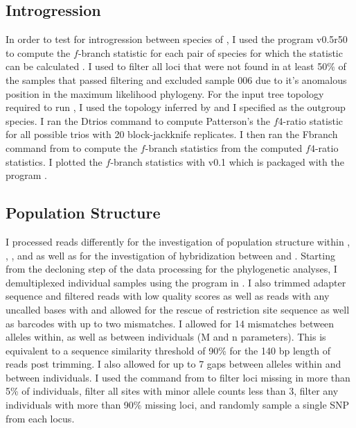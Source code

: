 \subsection{Introgression}
In order to test for introgression between species of \anaxyrus, I used the 
program \dsuite v0.5r50 \parencite{malinsky2021} to compute the $f$-branch 
statistic for each pair of \anaxyrus species for which the statistic 
can be calculated \parencite{reich2009,malinsky2018}. 
I used \pyrad to filter all loci that were not found in at least 50\% of the 
samples that passed filtering and excluded sample 006 due to it's anomalous 
position in the maximum likelihood phylogeny.
For the input tree topology required to run \dsuite, I used the topology inferred
by \phycoeval and I specified \nebulifer as the outgroup species.
I ran the \dsuite Dtrios command to compute Patterson's the $f4$-ratio
statistic for all possible trios with 20 block-jackknife replicates.
I then ran the Fbranch command from \dsuite to compute the $f$-branch statistics 
from the computed $f4$-ratio statistics. 
I plotted the $f$-branch statistics with \dtools v0.1 which is packaged with
the \dsuite program \parencite{malinsky2021}. 

\subsection{Population Structure}
I processed reads differently for the investigation of population structure within
\amer, \fowl, \terr, and \wood as well as for the investigation of hybridization
between \fowl and \wood. 
Starting from the decloning step of the data processing for the phylogenetic 
analyses, I demultiplexed individual samples using the \processradtags program 
in \structure. 
I also trimmed adapter sequence and filtered reads with low quality scores as 
well as reads with any uncalled bases with \processradtags and allowed for the rescue of 
restriction site sequence as well as barcodes with up to two mismatches.  
I allowed for 14 mismatches between alleles within, as well as between individuals
(M and n parameters). This is equivalent to a sequence similarity threshold of   
90\% for the 140 bp length of reads post trimming. 
I also allowed for up to 7 gaps between alleles within and between individuals.
I used the \populations command from \stacks to filter loci missing in more than   
5\% of individuals, filter all sites with minor allele counts less than 3, filter 
any individuals with more than 90\% missing loci, and randomly sample a single
SNP from each locus.

